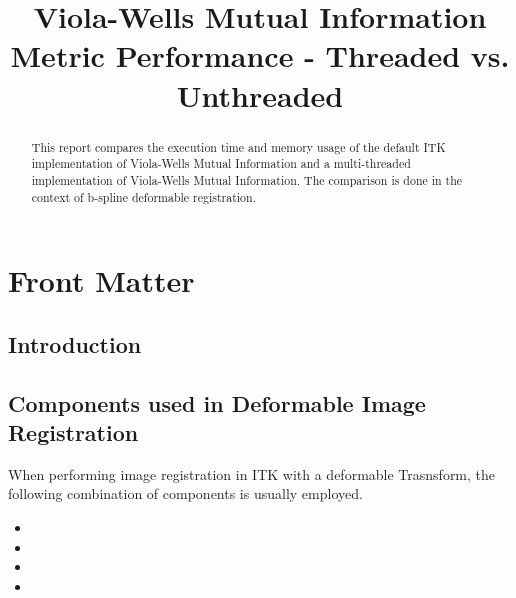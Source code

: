 \documentclass{InsightArticle}
\title{Viola-Wells Mutual Information Metric Performance - Threaded vs. Unthreaded}
\begin{document}
\ifpdf
\else
\fi


\maketitle


\ifhtml
\chapter*{Front Matter\label{front}}
\fi


\begin{abstract}
\noindent
This report compares the execution time and memory usage of the default ITK implementation of Viola-Wells Mutual Information
and a multi-threaded implementation of Viola-Wells Mutual Information. The comparison is done in the context of b-spline
deformable registration.
\end{abstract}

\tableofcontents

\section{Introduction}



\section{Components used in Deformable Image Registration}

When performing image registration in ITK with a deformable Trasnsform, the
following combination of components is usually employed.

\begin{itemize}
\item {}
\item {}
\item {}
\item {}
\end{itemize}
\end{document}
